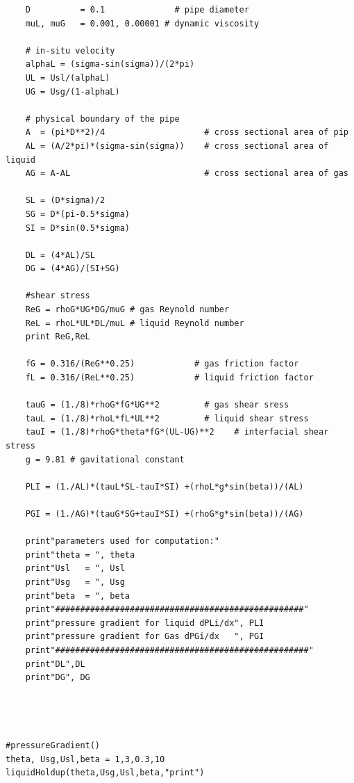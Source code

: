 \documentclass[10pt,a4paper]{report}
\begin{document}
\begin{lstlisting}
    D          = 0.1              # pipe diameter
    muL, muG   = 0.001, 0.00001 # dynamic viscosity
    
    # in-situ velocity
    alphaL = (sigma-sin(sigma))/(2*pi)
    UL = Usl/(alphaL)
    UG = Usg/(1-alphaL)
        
    # physical boundary of the pipe
    A  = (pi*D**2)/4                    # cross sectional area of pip
    AL = (A/2*pi)*(sigma-sin(sigma))    # cross sectional area of liquid
    AG = A-AL                           # cross sectional area of gas
        
    SL = (D*sigma)/2  
    SG = D*(pi-0.5*sigma)
    SI = D*sin(0.5*sigma)
        
    DL = (4*AL)/SL
    DG = (4*AG)/(SI+SG)               
        
    #shear stress
    ReG = rhoG*UG*DG/muG # gas Reynold number
    ReL = rhoL*UL*DL/muL # liquid Reynold number
    print ReG,ReL
    
    fG = 0.316/(ReG**0.25)            # gas friction factor
    fL = 0.316/(ReL**0.25)            # liquid friction factor
    
    tauG = (1./8)*rhoG*fG*UG**2         # gas shear sress
    tauL = (1./8)*rhoL*fL*UL**2         # liquid shear stress
    tauI = (1./8)*rhoG*theta*fG*(UL-UG)**2    # interfacial shear stress
    g = 9.81 # gavitational constant
    
    PLI = (1./AL)*(tauL*SL-tauI*SI) +(rhoL*g*sin(beta))/(AL)
        
    PGI = (1./AG)*(tauG*SG+tauI*SI) +(rhoG*g*sin(beta))/(AG)
    
    print"parameters used for computation:"
    print"theta = ", theta
    print"Usl   = ", Usl
    print"Usg   = ", Usg
    print"beta  = ", beta
    print"##################################################"
    print"pressure gradient for liquid dPLi/dx", PLI
    print"pressure gradient for Gas dPGi/dx   ", PGI
    print"###################################################"
    print"DL",DL
    print"DG", DG

        
        
    
#pressureGradient()
theta, Usg,Usl,beta = 1,3,0.3,10
liquidHoldup(theta,Usg,Usl,beta,"print")




    
    
    
    


\end{lstlisting}
\end{document}
